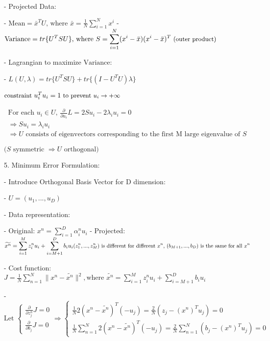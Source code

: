 - Projected Data:

- $\displaystyle \text{Mean} = {\bar x}^TU \text{, where } \bar x = \frac 1 N\sum_{i=1}^Nx^i$ 
- $\displaystyle \text{Variance} =  tr\{U^T S U\} \text{, where } S = \sum_{i=1}^N(x^i-\bar x)(x^i-\bar x)^T \space\small\text{ (outer product)}$ 

- Lagrangian to maximize $\text{Variance}$: 

- $\displaystyle L(U,\lambda)=tr\{U^TSU\}+tr\{(I-U^TU)\lambda\}$ 

	$\small\text{constraint }u_i^Tu_i=1 \text{ to prevent $u_i \rightarrow +\infty$ } $ 

\begin{gather}\text{For each $u_i\in U$, } \displaystyle \frac \partial {\partial u_i}L = 2Su_i-2\lambda_iu_i=0 \\ \Rightarrow Su_i=\lambda_iu_i \\ \Rightarrow \text{$U$ consists of eigenvectors corresponding to the first M large eigenvalue of $S$}\end{gather}

	\(\text{($S$ symmetric $\Rightarrow U$ orthogonal)}\)

5. Minimum Error Formulation:

- Introduce Orthogonal Basis Vector for D dimension:

- $U=(u_1,...,u_D)$ 

- Data representation:

- Original: $\displaystyle x^n = \sum_{i=1}^D\alpha^n_iu_i$ 
- Projected: \(\displaystyle \widetilde {x^n} = \sum_{i=1}^Mz_i^nu_i+\sum_{i=M+1}^Db_iu_i \\ \small\text{$(z_1^n,...,z_M^n)$ is different for different $x^n$, $(b_{M+1},...,b_D)$ is the same for all  $x^n$}\)

- Cost function: $\displaystyle J=\frac1N \sum^N_{n=1}\|x^n-\widetilde{x^n}\|^2, \text{where } \widetilde{x^n}=\sum_{i=1}^Mz^n_iu_i + \sum_{i=M+1}^Db_iu_i$ 

- $\text{Let } \begin{cases} \displaystyle \frac \partial {\partial z^n_j} J=0 \\ \displaystyle \frac \partial {\partial b_j}J=0 \end{cases} \Rightarrow \begin{cases} \displaystyle \frac 1 N 2(x^n-\widetilde{x^n})^T (-u_j) = \frac 2 N (z_j-(x^n)^Tu_j)=0 \\ \displaystyle \frac 1 N \sum_{n=1}^N2 (x^n-\widetilde {x^n})^T(-u_j) = \frac 2 N \sum_{n=1}^N (b_j-(x^n)^Tu_j)=0 \end{cases}$ 

